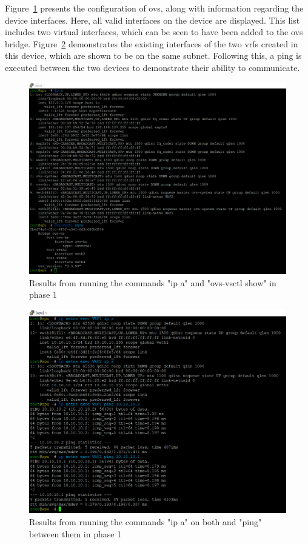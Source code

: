 Figure~\ref{fig:exp1_phase1_ovsctl_show} presents the configuration of \gls{ovs}, along with information regarding the device interfaces. Here, all valid interfaces on the device are displayed. This list includes two virtual interfaces, which can be seen to have been added to the \gls{ovs} bridge.
Figure~\ref{fig:exp1_phase1_pings} demonstrates the existing interfaces of the two \glspl{vrf} created in this device, which are shown to be on the same subnet. Following this, a ping is executed between the two devices to demonstrate their ability to communicate.

\begin{figure}
	\centering
	\includegraphics[width=\textwidth]{Chapters/Figures/tests/ovs_phase_1/device_ports&ovs_config.PNG}
	\caption{Results from running the commands "ip a" and "ovs-vsctl show" in phase 1}
	\label{fig:exp1_phase1_ovsctl_show}
\end{figure}

\begin{figure}
	\centering
	\includegraphics[width=\textwidth]{Chapters/Figures/tests/ovs_phase_1/VRF_config_&_pings.PNG}
	\caption{Results from running the commands "ip a" on both  and "ping" between them in phase 1}
	\label{fig:exp1_phase1_pings}
\end{figure}


